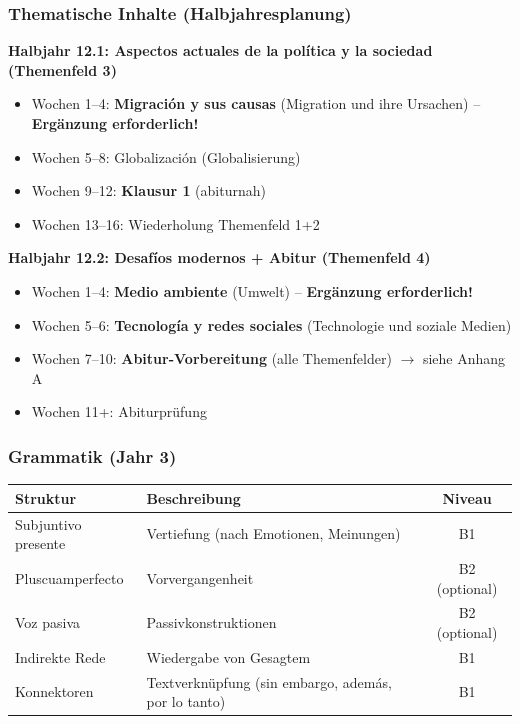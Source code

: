 \documentclass[10pt,a4paper]{article}
\begin{document}
\subsubsection{Thematische Inhalte (Halbjahresplanung)}

\textbf{Halbjahr 12.1: Aspectos actuales de la política y la sociedad (Themenfeld 3)}
\begin{itemize}[noitemsep]
\item Wochen 1--4: \textbf{Migración y sus causas} (Migration und ihre Ursachen) -- \textcolor{spanisch}{\textbf{Ergänzung erforderlich!}}
\item Wochen 5--8: Globalización (Globalisierung)
\item Wochen 9--12: \textbf{Klausur 1} (abiturnah)
\item Wochen 13--16: Wiederholung Themenfeld 1+2
\end{itemize}

\textbf{Halbjahr 12.2: Desafíos modernos + Abitur (Themenfeld 4)}
\begin{itemize}[noitemsep]
\item Wochen 1--4: \textbf{Medio ambiente} (Umwelt) -- \textcolor{spanisch}{\textbf{Ergänzung erforderlich!}}
\item Wochen 5--6: \textbf{Tecnología y redes sociales} (Technologie und soziale Medien)
\item Wochen 7--10: \textbf{Abitur-Vorbereitung} (alle Themenfelder) $\rightarrow$ siehe Anhang A
\item Wochen 11+: Abiturprüfung
\end{itemize}

\subsubsection{Grammatik (Jahr 3)}

\begin{center}
\small
\begin{tabular}{|l|p{6cm}|c|}
\hline
\rowcolor{lightgray}
\textbf{Struktur} & \textbf{Beschreibung} & \textbf{Niveau} \\
\hline
Subjuntivo presente & Vertiefung (nach Emotionen, Meinungen) & B1 \\
\hline
Pluscuamperfecto & Vorvergangenheit & B2 (optional) \\
\hline
Voz pasiva & Passivkonstruktionen & B2 (optional) \\
\hline
Indirekte Rede & Wiedergabe von Gesagtem & B1 \\
\hline
Konnektoren & Textverknüpfung (sin embargo, además, por lo tanto) & B1 \\
\hline
\end{tabular}
\end{center}
\end{document}
